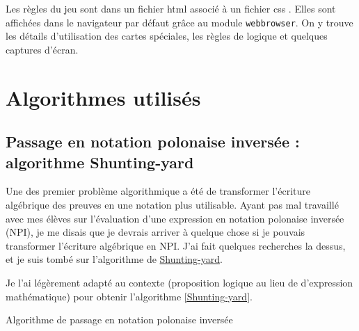 \documentclass[12pt, a4paper]{article}
\begin{document}
Les règles du jeu sont dans un fichier html associé à un fichier css . Elles sont affichées dans le navigateur par défaut grâce au module \texttt{webbrowser}. On y trouve les détails d'utilisation des cartes spéciales, les règles de logique et quelques captures d'écran.


\section{Algorithmes utilisés}

\subsection{Passage en notation polonaise inversée : algorithme Shunting-yard}

Une des premier problème algorithmique a été de transformer l'écriture algébrique des preuves en une notation plus utilisable. Ayant pas mal travaillé avec mes élèves sur l'évaluation d'une expression en notation polonaise inversée (NPI), je me disais que je devrais arriver à quelque chose si je pouvais transformer l'écriture algébrique en NPI. J'ai fait quelques recherches la dessus, et je suis tombé sur l'algorithme de \href{https://fr.wikipedia.org/wiki/Algorithme_Shunting-yard}{Shunting-yard}.

Je l'ai légèrement adapté au contexte (proposition logique au lieu de d'expression mathématique) pour obtenir l'algorithme \ref{Shunting-yard}.


\begin{algorithm}[h]
\caption{Algorithme de passage en notation polonaise inversée}
\label{Shunting-yard}
\end{algorithm}
\end{document}
